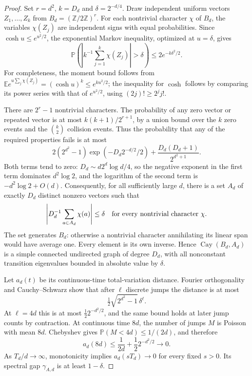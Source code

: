 \documentclass[11pt]{article}
\theoremstyle{remark}\newtheorem{remark}[theorem]{Remark}
\newcommand{\Z}{\mathbb Z}\newcommand{\Pp}{\mathbb P}\newcommand{\E}{\mathbb E}
\begin{document}
\begin{proof}
Set $r=d^2$, $k=D_d$ and $\delta=2^{-d/4}$. Draw independent uniform vectors $Z_1,\ldots,Z_k$ from $B_d=(\Z/2\Z)^r$. For each nontrivial character $\chi$ of $B_d$, the variables $\chi(Z_j)$ are independent signs with equal probabilities. Since $\cosh u\le e^{u^2/2}$, the exponential Markov inequality, optimized at $u=\delta$, gives
\[
 \Pp\left(\left|k^{-1}\sum_{j=1}^k\chi(Z_j)\right|>\delta\right)
 \le 2e^{-k\delta^2/2}.
\]
For completeness, the moment bound follows from
$\E e^{u\sum_j\chi(Z_j)}=(\cosh u)^k\le e^{ku^2/2}$; the inequality for $\cosh$ follows by comparing its power series with that of $e^{u^2/2}$, using $(2j)!\ge2^j j!$.

There are $2^r-1$ nontrivial characters. The probability of any zero vector or repeated vector is at most $k(k+1)/2^{r+1}$, by a union bound over the $k$ zero events and the $\binom{k}{2}$ collision events. Thus the probability that any of the required properties fails is at most
\begin{equation}\label{eq:paddingbad}
 2(2^{d^2}-1)\exp\left(-D_d2^{-d/2}/2\right)
 +\frac{D_d(D_d+1)}{2^{d^2+1}}.
\end{equation}
Both terms tend to zero: $D_d\sim d2^d\log d/4$, so the negative exponent in the first term dominates $d^2\log2$, and the logarithm of the second term is $-d^2\log2+O(d)$. Consequently, for all sufficiently large $d$, there is a set $A_d$ of exactly $D_d$ distinct nonzero vectors such that
\[
 \left|D_d^{-1}\sum_{a\in A_d}\chi(a)\right|\le\delta
 \quad\hbox{for every nontrivial character }\chi.
\]
The set generates $B_d$: otherwise a nontrivial character annihilating its linear span would have average one. Every element is its own inverse. Hence $\operatorname{Cay}(B_d,A_d)$ is a simple connected undirected graph of degree $D_d$, with all nonconstant transition eigenvalues bounded in absolute value by $\delta$.

Let $a_d(t)$ be its continuous-time total-variation distance. Fourier orthogonality and Cauchy--Schwarz show that after $\ell$ discrete jumps the distance is at most
\[
 \tfrac12\sqrt{2^{d^2}-1}\,\delta^\ell.
\]
At $\ell=4d$ this is at most $\tfrac12 2^{-d^2/2}$, and the same bound holds at later jump counts by contraction. At continuous time $8d$, the number of jumps $M$ is Poisson with mean $8d$. Chebyshev gives $\Pp(M<4d)\le1/(2d)$, and therefore
\[
 a_d(8d)\le\frac1{2d}+\frac12 2^{-d^2/2}\longrightarrow0.
\]
As $T_d/d\to\infty$, monotonicity implies $a_d(sT_d)\to0$ for every fixed $s>0$. Its spectral gap $\gamma_{A,d}$ is at least $1-\delta$.


\end{proof}
\end{document}
